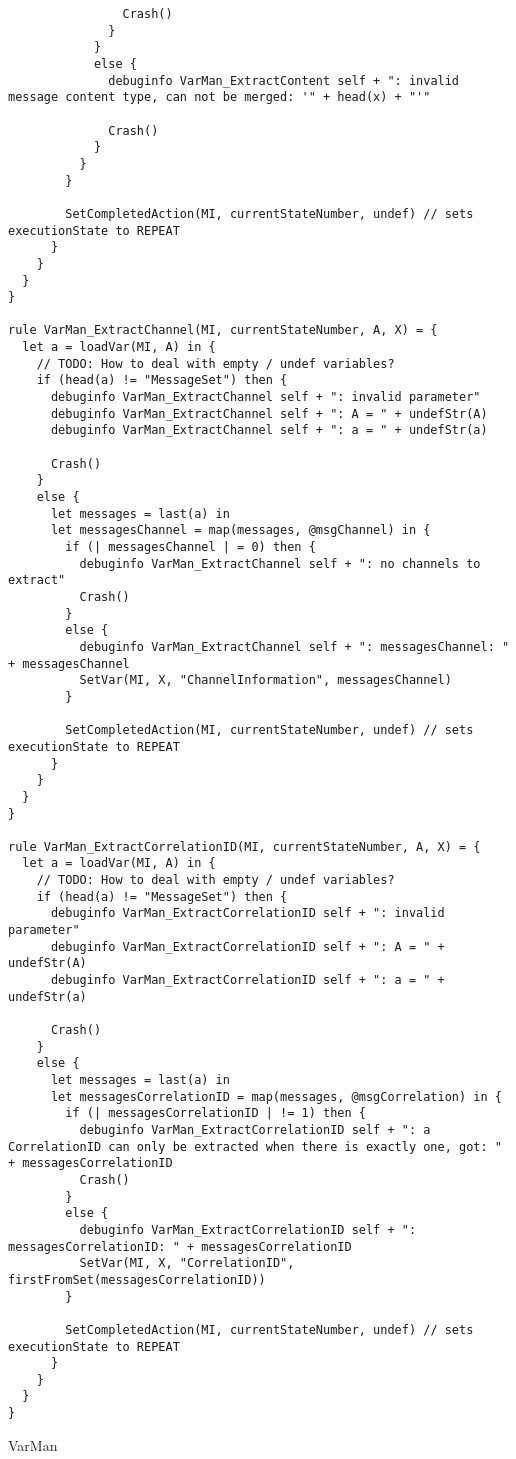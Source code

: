 \begin{listing}[H]
\begin{verbatim}
                Crash()
              }
            }
            else {
              debuginfo VarMan_ExtractContent self + ": invalid message content type, can not be merged: '" + head(x) + "'"

              Crash()
            }
          }
        }

        SetCompletedAction(MI, currentStateNumber, undef) // sets executionState to REPEAT
      }
    }
  }
}

rule VarMan_ExtractChannel(MI, currentStateNumber, A, X) = {
  let a = loadVar(MI, A) in {
    // TODO: How to deal with empty / undef variables?
    if (head(a) != "MessageSet") then {
      debuginfo VarMan_ExtractChannel self + ": invalid parameter"
      debuginfo VarMan_ExtractChannel self + ": A = " + undefStr(A)
      debuginfo VarMan_ExtractChannel self + ": a = " + undefStr(a)

      Crash()
    }
    else {
      let messages = last(a) in
      let messagesChannel = map(messages, @msgChannel) in {
        if (| messagesChannel | = 0) then {
          debuginfo VarMan_ExtractChannel self + ": no channels to extract"
          Crash()
        }
        else {
          debuginfo VarMan_ExtractChannel self + ": messagesChannel: " + messagesChannel
          SetVar(MI, X, "ChannelInformation", messagesChannel)
        }

        SetCompletedAction(MI, currentStateNumber, undef) // sets executionState to REPEAT
      }
    }
  }
}

rule VarMan_ExtractCorrelationID(MI, currentStateNumber, A, X) = {
  let a = loadVar(MI, A) in {
    // TODO: How to deal with empty / undef variables?
    if (head(a) != "MessageSet") then {
      debuginfo VarMan_ExtractCorrelationID self + ": invalid parameter"
      debuginfo VarMan_ExtractCorrelationID self + ": A = " + undefStr(A)
      debuginfo VarMan_ExtractCorrelationID self + ": a = " + undefStr(a)

      Crash()
    }
    else {
      let messages = last(a) in
      let messagesCorrelationID = map(messages, @msgCorrelation) in {
        if (| messagesCorrelationID | != 1) then {
          debuginfo VarMan_ExtractCorrelationID self + ": a CorrelationID can only be extracted when there is exactly one, got: " + messagesCorrelationID
          Crash()
        }
        else {
          debuginfo VarMan_ExtractCorrelationID self + ": messagesCorrelationID: " + messagesCorrelationID
          SetVar(MI, X, "CorrelationID", firstFromSet(messagesCorrelationID))
        }

        SetCompletedAction(MI, currentStateNumber, undef) // sets executionState to REPEAT
      }
    }
  }
}
\end{verbatim}
\caption{VarMan}
\label{lst:asm:VarMan}
\end{listing}




